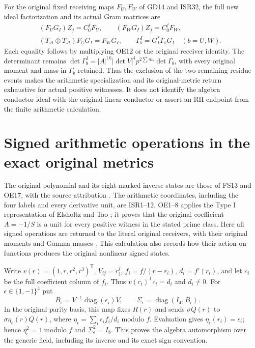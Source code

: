 \documentclass[11pt]{article}
\begin{document}
For the original fixed receiving maps $F_U,F_W$ of GD14 and ISR32,
the full new ideal factorization and its actual Gram matrices are
\begin{equation}
 \begin{aligned}
 &(F_U G_I)Z_j=C_0^jF_U,\qquad (F_W G_I)Z_j=C_0^jF_W,\\
 &(T_{\mathcal A}\oplus T_{\mathcal A})F_U G_I=F_WG_I,
 \qquad \Gamma_b^I=G_I^*\Gamma_b G_I\quad(b=U,W).
 \end{aligned}                                          \tag{OE18}
\end{equation}
Each equality follows by multiplying OE12 or the original receiver
identity. The determinant remains
$\det\Gamma_b^I=|A|^{16}|\det V|^4p^{2\sum m_i}\det\Gamma_b$,
with every original moment and mass in $\Gamma_b$ retained.
Thus the exclusion of the two remaining residue events makes the
arithmetic specialization and its original-metric return exhaustive
for actual positive witnesses. It does not identify the algebra
conductor ideal with the original linear conductor or assert an
RH endpoint from the finite arithmetic calculation.

\section{Signed arithmetic operations in the exact original metrics}
The original polynomial and its eight marked inverse states are those of
FS13 and OE17, with the source attribution \cite{ES488,Tao}. The arithmetic
coordinates, including the four labels and every derivative unit, are
ISR1--12. OE1--8 applies the Type I representation of
Elsholtz and Tao \cite[Section~2]{ElsholtzTao2015}; it proves that the
original coefficient $A=-1/S$ is a unit for every positive witness in
the stated prime class. Here all signed operations are returned to the
literal original receivers, with their original moments and Gamma masses
\cite{WCF}. This calculation also records how their action on functions
produces the original nonlinear signed states.

Write $v(r)=(1,r,r^2,r^3)^{\mathsf T}$, $V_{ij}=r_i^j$,
$f_i=f/(r-r_i)$, $d_i=f'(r_i)$, and let $c_i$ be the full coefficient
column of $f_i$. Thus $v(r_i)^{\mathsf T}c_i=d_i$ and $d_i\ne0$.
For $\epsilon\in\{1,-1\}^4$ put
\[
 B_\epsilon=V^{-1}\operatorname{diag}(\epsilon_i)V,
 \qquad \Sigma_\epsilon=\operatorname{diag}(I_4,B_\epsilon).
 \tag{SGR1}
\]
In the original parity basis, this map fixes $R(r)$ and sends
$\sigma Q(r)$ to $\sigma\eta_\epsilon(r)Q(r)$, where
$\eta_\epsilon=\sum_i\epsilon_i f_i/d_i$ modulo $f$.
Evaluation gives $\eta_\epsilon(r_i)=\epsilon_i$; hence
$\eta_\epsilon^2=1$ modulo $f$ and $\Sigma_\epsilon^2=I_8$.
This proves the algebra automorphism over the generic field, including
its inverse and its exact sign convention.
\end{document}
